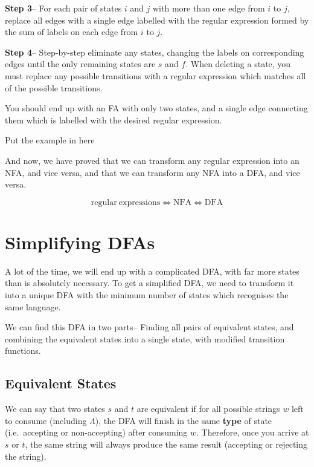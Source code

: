\textbf{Step 3}-- For each pair of states $i$ and $j$ with more than one edge from $i$ to $j$, replace all edges with a
 single edge labelled with the regular expression formed by the sum of labels on each edge from $i$ to $j$.

\textbf{Step 4}-- Step-by-step eliminate any states, changing the labels on corresponding edges until the only remaining
 states are $s$ and $f$. When deleting a state, you must replace any possible transitions with a regular expression
 which matches all of the possible transitions.

You should end up with an FA with only two states, and a single edge connecting them which is labelled with the desired
 regular expression.

\begin{example*}{}{}
  {\Huge Put the example in here}
\end{example*}

And now, we have proved that we can transform any regular expression into an NFA, and vice versa, and that we can
 transform any NFA into a DFA, and vice versa.

\begin{equation*}
  \mathrm{regular\ expressions} \Leftrightarrow \mathrm{NFA} \Leftrightarrow \mathrm{DFA}
\end{equation*}

\section*{Simplifying DFAs}

A lot of the time, we will end up with a complicated DFA, with far more states than is absolutely necessary. To get a
 simplified DFA, we need to transform it into a unique DFA with the minimum number of states which recognises the same
 language.

We can find this DFA in two parts-- Finding all pairs of equivalent states, and combining the equivalent states into a
 single state, with modified transition functions.

\subsection*{Equivalent States}

We can say that two states $s$ and $t$ are equivalent if for all possible strings $w$ left to consume (including $\Lambda$),
 the DFA will finish in the same \textbf{type} of state (i.e.\ accepting or non-accepting) after consuming $w$. Therefore,
 once you arrive at $s$ or $t$, the same string will always produce the same result (accepting or rejecting the string).

